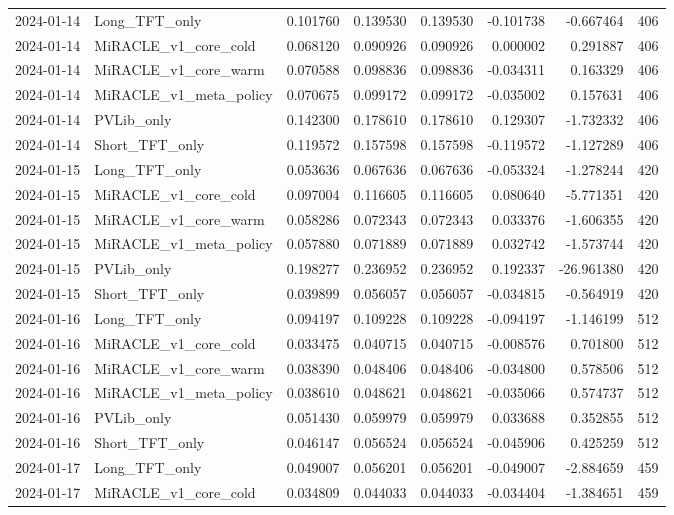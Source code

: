 \begin{tabular}{llrrrrrr}
2024-01-14 & Long_TFT_only & 0.101760 & 0.139530 & 0.139530 & -0.101738 & -0.667464 & 406 \\
2024-01-14 & MiRACLE_v1_core_cold & 0.068120 & 0.090926 & 0.090926 & 0.000002 & 0.291887 & 406 \\
2024-01-14 & MiRACLE_v1_core_warm & 0.070588 & 0.098836 & 0.098836 & -0.034311 & 0.163329 & 406 \\
2024-01-14 & MiRACLE_v1_meta_policy & 0.070675 & 0.099172 & 0.099172 & -0.035002 & 0.157631 & 406 \\
2024-01-14 & PVLib_only & 0.142300 & 0.178610 & 0.178610 & 0.129307 & -1.732332 & 406 \\
2024-01-14 & Short_TFT_only & 0.119572 & 0.157598 & 0.157598 & -0.119572 & -1.127289 & 406 \\
2024-01-15 & Long_TFT_only & 0.053636 & 0.067636 & 0.067636 & -0.053324 & -1.278244 & 420 \\
2024-01-15 & MiRACLE_v1_core_cold & 0.097004 & 0.116605 & 0.116605 & 0.080640 & -5.771351 & 420 \\
2024-01-15 & MiRACLE_v1_core_warm & 0.058286 & 0.072343 & 0.072343 & 0.033376 & -1.606355 & 420 \\
2024-01-15 & MiRACLE_v1_meta_policy & 0.057880 & 0.071889 & 0.071889 & 0.032742 & -1.573744 & 420 \\
2024-01-15 & PVLib_only & 0.198277 & 0.236952 & 0.236952 & 0.192337 & -26.961380 & 420 \\
2024-01-15 & Short_TFT_only & 0.039899 & 0.056057 & 0.056057 & -0.034815 & -0.564919 & 420 \\
2024-01-16 & Long_TFT_only & 0.094197 & 0.109228 & 0.109228 & -0.094197 & -1.146199 & 512 \\
2024-01-16 & MiRACLE_v1_core_cold & 0.033475 & 0.040715 & 0.040715 & -0.008576 & 0.701800 & 512 \\
2024-01-16 & MiRACLE_v1_core_warm & 0.038390 & 0.048406 & 0.048406 & -0.034800 & 0.578506 & 512 \\
2024-01-16 & MiRACLE_v1_meta_policy & 0.038610 & 0.048621 & 0.048621 & -0.035066 & 0.574737 & 512 \\
2024-01-16 & PVLib_only & 0.051430 & 0.059979 & 0.059979 & 0.033688 & 0.352855 & 512 \\
2024-01-16 & Short_TFT_only & 0.046147 & 0.056524 & 0.056524 & -0.045906 & 0.425259 & 512 \\
2024-01-17 & Long_TFT_only & 0.049007 & 0.056201 & 0.056201 & -0.049007 & -2.884659 & 459 \\
2024-01-17 & MiRACLE_v1_core_cold & 0.034809 & 0.044033 & 0.044033 & -0.034404 & -1.384651 & 459 \\

\end{tabular}
